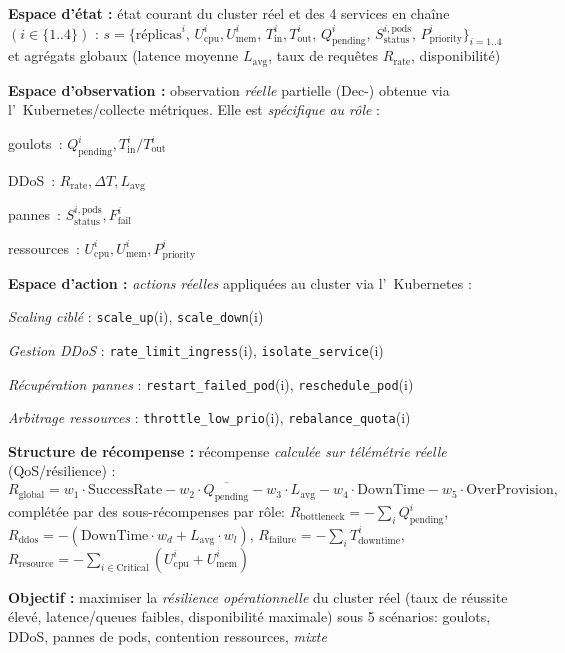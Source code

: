 \begin{enumerate*}[label={\roman*)}, itemjoin={;\quad}]
  \item \textbf{Espace d'état :} état courant du cluster réel et des 4 services en chaîne \((i \in \{1..4\})\) :
  \(
  s = \{\text{réplicas}^i,\,
  U_{\text{cpu}}^i, U_{\text{mem}}^i,\,
  T_{\text{in}}^i, T_{\text{out}}^i,\,
  Q_{\text{pending}}^i,\,
  S_{\text{status}}^{i,\text{pods}},\,
  P_{\text{priority}}^i\}_{i=1..4}
  \)
  et agrégats globaux (latence moyenne \(L_{\text{avg}}\), taux de requêtes \(R_{\text{rate}}\), disponibilité)
  \item \textbf{Espace d'observation :} observation \emph{réelle} partielle (Dec-) obtenue via l’~Kubernetes/collecte métriques. Elle est \emph{spécifique au rôle} :
  \begin{enumerate*}[label={}, itemjoin={;\,}]
    \item goulots~: \(Q_{\text{pending}}^i, T_{\text{in}}^i/T_{\text{out}}^i\)
    \item DDoS~: \(R_{\text{rate}}, \Delta T, L_{\text{avg}}\)
    \item pannes~: \(S_{\text{status}}^{i,\text{pods}}, F_{\text{fail}}^i\)
    \item ressources~: \(U_{\text{cpu}}^i, U_{\text{mem}}^i, P_{\text{priority}}^i\)
  \end{enumerate*}
  \item \textbf{Espace d'action :} \emph{actions réelles} appliquées au cluster via l’~Kubernetes :
  \begin{enumerate*}[label={\roman*)}, itemjoin={;\quad}]
    \item \emph{Scaling ciblé} : \texttt{scale\_up}(i), \texttt{scale\_down}(i)
    \item \emph{Gestion DDoS} : \texttt{rate\_limit\_ingress}(i), \texttt{isolate\_service}(i)
    \item \emph{Récupération pannes} : \texttt{restart\_failed\_pod}(i), \texttt{reschedule\_pod}(i)
    \item \emph{Arbitrage ressources} : \texttt{throttle\_low\_prio}(i), \texttt{rebalance\_quota}(i)
  \end{enumerate*}
  \item \textbf{Structure de récompense :} récompense \emph{calculée sur télémétrie réelle} (QoS/résilience) :
  \[
    R_{\text{global}}=
    w_1\cdot\text{SuccessRate}
    -w_2\cdot\overline{Q_{\text{pending}}}
    -w_3\cdot L_{\text{avg}}
    -w_4\cdot \text{DownTime}
    -w_5\cdot \text{OverProvision},
  \]
  complétée par des sous-récompenses par rôle:
  \(R_{\text{bottleneck}}=-\sum_i Q_{\text{pending}}^i\),
  \(R_{\text{ddos}}=-(\text{DownTime}\cdot w_d+L_{\text{avg}}\cdot w_l)\),
  \(R_{\text{failure}}=-\sum_i T_{\text{downtime}}^i\),
  \(R_{\text{resource}}=-\sum_{i\in\text{Critical}}(U_{\text{cpu}}^i+U_{\text{mem}}^i)\)
  \item \textbf{Objectif :} maximiser la \emph{résilience opérationnelle} du cluster réel (taux de réussite élevé, latence/queues faibles, disponibilité maximale) sous 5 scénarios: goulots, DDoS, pannes de pods, contention ressources, \emph{mixte}
\end{enumerate*}

